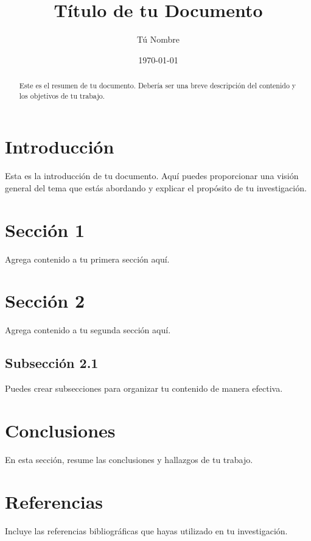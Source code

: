 \documentclass{article}
\title{Título de tu Documento}
\author{Tú Nombre}
\date{\today}
\begin{document}
\maketitle

\begin{abstract}
    Este es el resumen de tu documento. Debería ser una breve descripción del contenido y los objetivos de tu trabajo.
\end{abstract}

\section{Introducción}

Esta es la introducción de tu documento. Aquí puedes proporcionar una visión general del tema que estás abordando y explicar el propósito de tu investigación.

\section{Sección 1}

Agrega contenido a tu primera sección aquí.

\section{Sección 2}

Agrega contenido a tu segunda sección aquí.

\subsection{Subsección 2.1}

Puedes crear subsecciones para organizar tu contenido de manera efectiva.

\section{Conclusiones}

En esta sección, resume las conclusiones y hallazgos de tu trabajo.

\section{Referencias}

Incluye las referencias bibliográficas que hayas utilizado en tu investigación.
\end{document}

